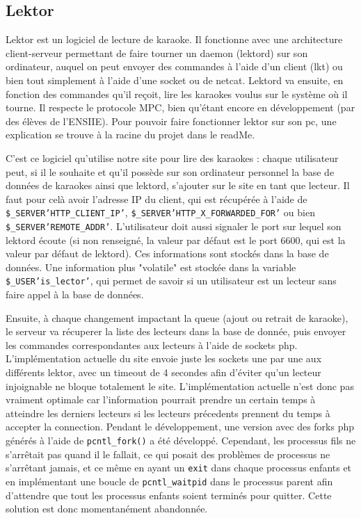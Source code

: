 \subsection{Lektor}

Lektor est un logiciel de lecture de karaoke. Il fonctionne avec une architecture client-serveur permettant de faire tourner un daemon (lektord) sur son ordinateur, auquel on peut envoyer des commandes à l'aide d'un client (lkt) ou bien tout simplement à l'aide d'une socket ou de netcat. Lektord va ensuite, en fonction des commandes qu'il reçoit, lire les karaokes voulus sur le système où il tourne. Il respecte le protocole MPC, bien qu'étant encore en développement (par des élèves de
l'ENSIIE).\newline
Pour pouvoir faire fonctionner lektor sur son pc, une explication se trouve à la racine du projet dans le readMe.\newline

C'est ce logiciel qu'utilise notre site pour lire des karaokes : chaque utilisateur peut, si il le souhaite et qu'il possède sur son ordinateur personnel la base de données de karaokes ainsi que lektord, s'ajouter sur le site en tant que lecteur. Il faut pour celà avoir l'adresse IP du client, qui est récupérée à l'aide de \texttt{\$\_SERVER\lbrack'HTTP\_CLIENT\_IP'\rbrack}, \texttt{\$\_SERVER\lbrack'HTTP\_X\_FORWARDED\_FOR'\rbrack} ou bien \texttt{\$\_SERVER\lbrack'REMOTE\_ADDR'\rbrack}.
L'utilisateur doit aussi signaler le port sur lequel son lektord écoute (si non renseigné, la valeur par défaut est le port 6600, qui est la valeur par défaut de lektord).
Ces informations sont stockés dans la base de données.
Une information plus "volatile" est stockée dans la variable \texttt{\$\_USER\lbrack'is\_lector'\rbrack}, qui permet de savoir si un utilisateur est un lecteur sans faire appel à la base de données.

Ensuite, à chaque changement impactant la queue (ajout ou retrait de karaoke), le serveur va récuperer la liste des lecteurs dans la base de donnée, puis envoyer les commandes correspondantes aux lecteurs à l'aide de sockets php.
L'implémentation actuelle du site envoie juste les sockets une par une aux différents lektor, avec un timeout de 4 secondes afin d'éviter qu'un lecteur injoignable ne bloque totalement le site. L'implémentation actuelle n'est donc pas vraiment optimale car l'information pourrait prendre un certain temps à atteindre les derniers lecteurs si les lecteurs précedents prennent du temps à accepter la connection. Pendant le développement, une version avec des forks php générés à l'aide de
\texttt{pcntl\_fork()} a été développé. Cependant, les processus fils ne s'arrêtait pas quand il le fallait, ce qui posait des problèmes de processus ne s'arrêtant jamais, et ce même en ayant un \texttt{exit} dans chaque processus enfants et en implémentant une boucle de \texttt{pcntl\_waitpid} dans le processus parent afin d'attendre que tout les processus enfants soient terminés pour quitter.
Cette solution est donc momentanément abandonnée.
